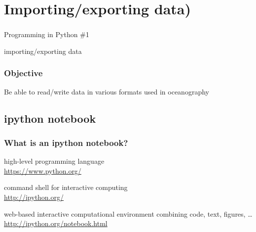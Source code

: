 \section{Importing/exporting data)}

{
\begin{frame}
\frametitle{}
{\fontsize{40}{50}\selectfont Programming in Python \#1} 

{\huge importing/exporting data} 

\end{frame}
}



\begin{frame}
\frametitle{Objective}

Be able to read/write data in various formats used in oceanography

\vfill 

\vfill 
{}

\end{frame}

\subsection{ipython notebook}

\begin{frame}[c]
\frametitle{What is an ipython notebook?}


\begin{description}
\item<2->[Python:] high-level programming language\\ 
\url{https://www.python.org/}
\item<3->[IPython:] command shell for interactive computing\\ 
\url{http://ipython.org/}
\item<4->[IPython notebook:] web-based interactive computational environment combining code, text, figures, \ldots\\
\url{http://ipython.org/notebook.html}
\end{description}

\end{frame}

